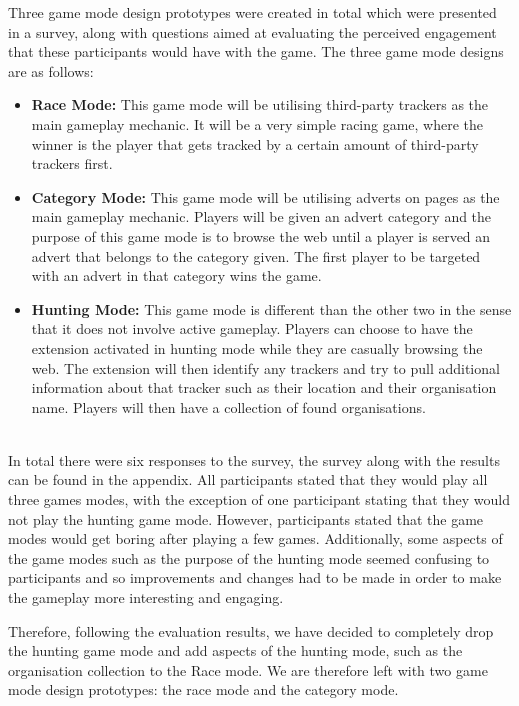 \documentclass{l4proj}
\begin{document}
Three game mode design prototypes were created in total which were presented in a survey, along with questions aimed at evaluating the perceived engagement that these participants would have with the game. The three game mode designs are as follows:
\\
\begin{itemize}
   \item
   \textbf{Race Mode:} This game mode will be utilising third-party trackers as the main gameplay mechanic. It will be a very simple racing game, where the winner is the player that gets tracked by a certain amount of third-party trackers first.

   \item
   \textbf{Category Mode:} This game mode will be utilising adverts on pages as the main gameplay mechanic. Players will be given an advert category and the purpose of this game mode is to browse the web until a player is served an advert that belongs to the category given. The first player to be targeted with an advert in that category wins the game.

   \item
   \textbf{Hunting Mode:} This game mode is different than the other two in the sense that it does not involve active gameplay. Players can choose to have the extension activated in hunting mode while they are casually browsing the web. The extension will then identify any trackers and try to pull additional information about that tracker such as their location and their organisation name. Players will then have a collection of found organisations.
\end{itemize} 
\\
In total there were six responses to the survey, the survey along with the results can be found in the appendix. All participants stated that they would play all three games modes, with the exception of one participant stating that they would not play the hunting game mode. However, participants stated that the game modes would get boring after playing a few games. Additionally, some aspects of the game modes such as the purpose of the hunting mode seemed confusing to participants and so improvements and changes had to be made in order to make the gameplay more interesting and engaging.

Therefore, following the evaluation results, we have decided to completely drop the hunting game mode and add aspects of the hunting mode, such as the organisation collection to the Race mode. We are therefore left with two game mode design prototypes: the race mode and the category mode.
\end{document}
